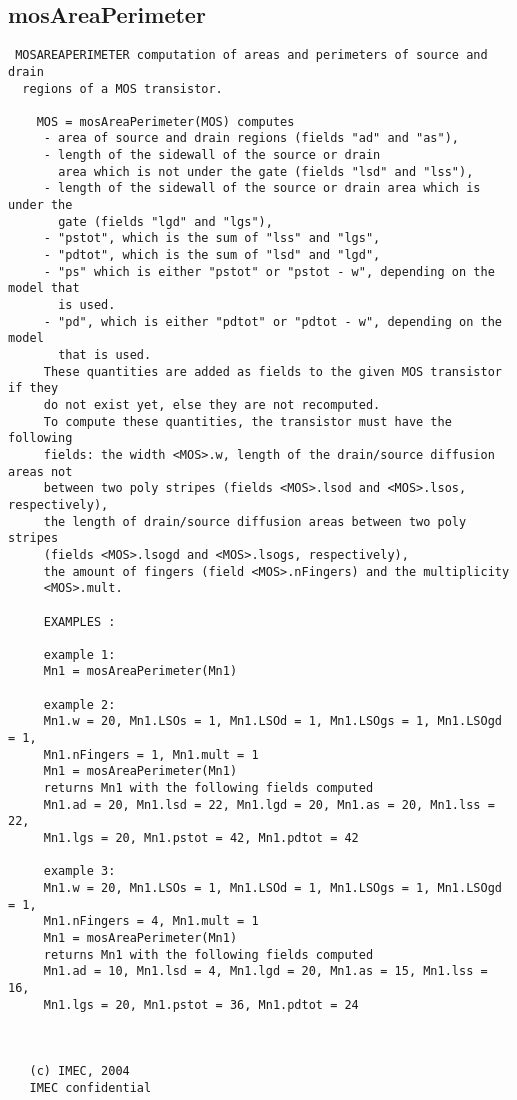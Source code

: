 \subsection{mosAreaPerimeter}
\label{sec:mosAreaPerimeter}
\begin{verbatim}
 MOSAREAPERIMETER computation of areas and perimeters of source and drain 
  regions of a MOS transistor.
 
    MOS = mosAreaPerimeter(MOS) computes 
     - area of source and drain regions (fields "ad" and "as"), 
     - length of the sidewall of the source or drain
       area which is not under the gate (fields "lsd" and "lss"), 
     - length of the sidewall of the source or drain area which is under the
       gate (fields "lgd" and "lgs"), 
     - "pstot", which is the sum of "lss" and "lgs",
     - "pdtot", which is the sum of "lsd" and "lgd",
     - "ps" which is either "pstot" or "pstot - w", depending on the model that
       is used.
     - "pd", which is either "pdtot" or "pdtot - w", depending on the model
       that is used. 
     These quantities are added as fields to the given MOS transistor if they
     do not exist yet, else they are not recomputed.
     To compute these quantities, the transistor must have the following
     fields: the width <MOS>.w, length of the drain/source diffusion areas not
     between two poly stripes (fields <MOS>.lsod and <MOS>.lsos, respectively),
     the length of drain/source diffusion areas between two poly stripes
     (fields <MOS>.lsogd and <MOS>.lsogs, respectively),
     the amount of fingers (field <MOS>.nFingers) and the multiplicity
     <MOS>.mult.
 
     EXAMPLES :
 
     example 1:
     Mn1 = mosAreaPerimeter(Mn1)
 
     example 2:
     Mn1.w = 20, Mn1.LSOs = 1, Mn1.LSOd = 1, Mn1.LSOgs = 1, Mn1.LSOgd = 1,
     Mn1.nFingers = 1, Mn1.mult = 1 
     Mn1 = mosAreaPerimeter(Mn1)
     returns Mn1 with the following fields computed
     Mn1.ad = 20, Mn1.lsd = 22, Mn1.lgd = 20, Mn1.as = 20, Mn1.lss = 22, 
     Mn1.lgs = 20, Mn1.pstot = 42, Mn1.pdtot = 42
    
     example 3:    
     Mn1.w = 20, Mn1.LSOs = 1, Mn1.LSOd = 1, Mn1.LSOgs = 1, Mn1.LSOgd = 1,
     Mn1.nFingers = 4, Mn1.mult = 1
     Mn1 = mosAreaPerimeter(Mn1)
     returns Mn1 with the following fields computed
     Mn1.ad = 10, Mn1.lsd = 4, Mn1.lgd = 20, Mn1.as = 15, Mn1.lss = 16,
     Mn1.lgs = 20, Mn1.pstot = 36, Mn1.pdtot = 24
 
 
 
   (c) IMEC, 2004
   IMEC confidential 
 

\end{verbatim}

